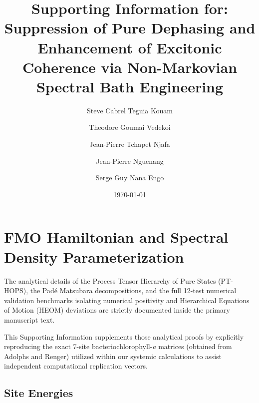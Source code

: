 \documentclass[aip,jcp,reprint]{revtex4-2}
\begin{document}
\title{\textbf{Supporting Information for:\\Suppression of Pure Dephasing and Enhancement of Excitonic Coherence via Non-Markovian Spectral Bath Engineering}}

\author{Steve Cabrel Teguia Kouam}

\author{Theodore Goumai Vedekoi}

\author{Jean-Pierre Tchapet Njafa}

\author{Jean-Pierre Nguenang}

\author{Serge Guy Nana Engo}

\date{\today}
\maketitle

\section{FMO Hamiltonian and Spectral Density Parameterization}

The analytical details of the Process Tensor Hierarchy of Pure States (PT-HOPS), the Padé Matsubara decompositions, and the full 12-test numerical validation benchmarks isolating numerical positivity and Hierarchical Equations of Motion (HEOM) deviations are strictly documented inside the primary manuscript text.

This Supporting Information supplements those analytical proofs by explicitly reproducing the exact 7-site bacteriochlorophyll-\textit{a} matrices (obtained from Adolphs and Renger\cite{Adolphs2006}) utilized within our systemic calculations to assist independent computational replication vectors.

\subsection{Site Energies}
\end{document}
